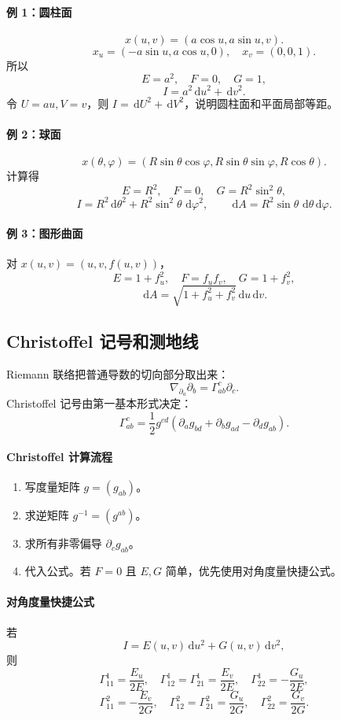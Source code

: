 \documentclass[UTF8,12pt,a4paper]{ctexart}
\newcommand{\dd}{\,\mathrm d}
\begin{document}
\paragraph{例 1：圆柱面}
\[
x(u,v)=(a\cos u,a\sin u,v).
\]
\[
x_u=(-a\sin u,a\cos u,0),\quad x_v=(0,0,1).
\]
所以
\[
E=a^2,\quad F=0,\quad G=1,
\]
\[
I=a^2\dd u^2+\dd v^2.
\]
令 $U=au,V=v$，则 $I=\dd U^2+\dd V^2$，说明圆柱面和平面局部等距。

\paragraph{例 2：球面}
\[
x(\theta,\varphi)=
(R\sin\theta\cos\varphi,R\sin\theta\sin\varphi,R\cos\theta).
\]
计算得
\[
E=R^2,\quad F=0,\quad G=R^2\sin^2\theta,
\]
\[
I=R^2\dd\theta^2+R^2\sin^2\theta\,\dd\varphi^2,
\qquad
\dd A=R^2\sin\theta\,\dd\theta\dd\varphi.
\]

\paragraph{例 3：图形曲面}
对 $x(u,v)=(u,v,f(u,v))$，
\[
E=1+f_u^2,\quad F=f_uf_v,\quad G=1+f_v^2,
\]
\[
\dd A=\sqrt{1+f_u^2+f_v^2}\dd u\dd v.
\]

\subsection{Christoffel 记号和测地线}

Riemann 联络把普通导数的切向部分取出来：
\[
\nabla_{\partial_a}\partial_b=\Gamma^c_{ab}\partial_c.
\]
Christoffel 记号由第一基本形式决定：
\[
\Gamma^c_{ab}=
\frac12g^{cd}
\left(
\partial_ag_{bd}+\partial_bg_{ad}-\partial_dg_{ab}
\right).
\]

\paragraph{Christoffel 计算流程}
\begin{enumerate}
\item 写度量矩阵 $g=(g_{ab})$。
\item 求逆矩阵 $g^{-1}=(g^{ab})$。
\item 求所有非零偏导 $\partial_cg_{ab}$。
\item 代入公式。若 $F=0$ 且 $E,G$ 简单，优先使用对角度量快捷公式。
\end{enumerate}

\paragraph{对角度量快捷公式}
若
\[
I=E(u,v)\dd u^2+G(u,v)\dd v^2,
\]
则
\[
\Gamma^1_{11}=\frac{E_u}{2E},\quad
\Gamma^1_{12}=\Gamma^1_{21}=\frac{E_v}{2E},\quad
\Gamma^1_{22}=-\frac{G_u}{2E},
\]
\[
\Gamma^2_{11}=-\frac{E_v}{2G},\quad
\Gamma^2_{12}=\Gamma^2_{21}=\frac{G_u}{2G},\quad
\Gamma^2_{22}=\frac{G_v}{2G}.
\]
\end{document}
